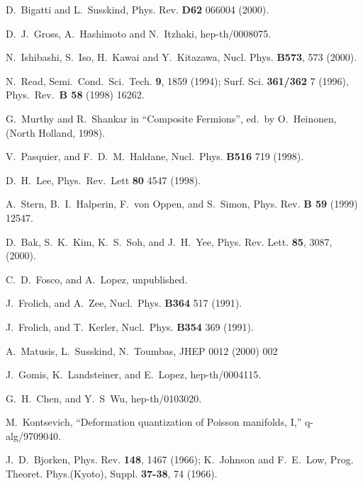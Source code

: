 \documentclass[a4paper,12pt]{article}
\begin{document}
\begin{thebibliography}{bib}
D.~Bigatti and L.~Susskind, Phys. Rev. {\bf D62} 066004
  (2000).
  
D.~J.~Gross, A.~Hashimoto and N.~Itzhaki,
hep-th/0008075.
  
N.~Ishibashi, S.~Iso, H.~Kawai and Y.~Kitazawa, Nucl.
  Phys. {\bf B573}, 573 (2000).
  
N.~Read, Semi.~Cond.~Sci.~Tech. {\bf 9}, 1859 (1994);
  Surf. Sci. {\bf 361/362} 7 (1996), Phys.~Rev.~{\bf B 58} (1998)
  16262.
  
G.~Murthy and R.~Shankar in ``Composite Fermions'',
ed.\ 
  by O.~Heinonen, (North Holland, 1998).
  
V.~Pasquier, and F.~D.~M.~Haldane, Nucl.~Phys.  {\bf
B516}
  719 (1998).
  
D.~H.~Lee, Phys.~Rev.~Lett {\bf 80} 4547 (1998).
  
A.~Stern, B.~I.~Halperin, F.~von Oppen, and S.~Simon,
  Phys. Rev. {\bf B 59} (1999) 12547.
  
D.~Bak, S.~K.~Kim, K.~S.~Soh, and J.~H.~Yee, Phys. Rev.
  Lett. {\bf 85}, 3087, (2000).
  
C.~D.~Fosco, and A.~Lopez, unpublished.
  
J.~Frolich, and A.~Zee, Nucl.~Phys. {\bf B364} 517
(1991).
  
J.~Frolich, and T.~Kerler, Nucl.~Phys. {\bf B354} 369
  (1991).
  
A.~Matusis, L.~Susskind, N.~Toumbas, JHEP 0012 (2000)
002
  
J.~Gomis, K.~Landsteiner, and E.~Lopez,
hep-th/0004115.
  
G.~H.~Chen, and Y.~S~Wu, hep-th/0103020.
  
M.~Kontsevich, ``Deformation quantization of
  Poisson manifolds, I,'' q-alg/9709040.
  
J.~D.~Bjorken, Phys. Rev. {\bf 148}, 1467 (1966);
  K.~Johnson and F.~E.~Low, Prog. Theoret. Phys.(Kyoto), Suppl.{\bf
    37-38}, 74 (1966).

\end{thebibliography}
\end{document}
